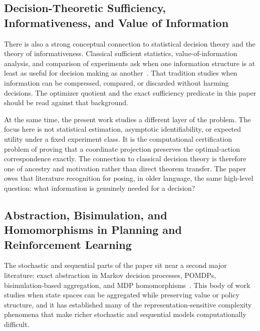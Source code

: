 \subsection{Decision-Theoretic Sufficiency, Informativeness, and Value of Information}

There is also a strong conceptual connection to statistical decision theory and the theory of informativeness. Classical sufficient statistics, value-of-information analysis, and comparison of experiments ask when one information structure is at least as useful for decision making as another~\cite{blackwell1953equivalent,savage1954foundations,raiffa1961applied,howard1966information}. That tradition studies when information can be compressed, compared, or discarded without harming decisions. The optimizer quotient and the exact sufficiency predicate in this paper should be read against that background.

At the same time, the present work studies a different layer of the problem. The focus here is not statistical estimation, asymptotic identifiability, or expected utility under a fixed experiment class. It is the computational certification problem of proving that a coordinate projection preserves the optimal-action correspondence exactly. The connection to classical decision theory is therefore one of ancestry and motivation rather than direct theorem transfer. The paper owes that literature recognition for posing, in older language, the same high-level question: what information is genuinely needed for a decision?

\subsection{Abstraction, Bisimulation, and Homomorphisms in Planning and Reinforcement Learning}

The stochastic and sequential parts of the paper sit near a second major literature: exact abstraction in Markov decision processes, POMDPs, bisimulation-based aggregation, and MDP homomorphisms~\cite{papadimitriou1987mdp,littman1998probplanning,mundhenk2000mdp,givan2003equivalence,ravindran2004algebraic}. This body of work studies when state spaces can be aggregated while preserving value or policy structure, and it has established many of the representation-sensitive complexity phenomena that make richer stochastic and sequential models computationally difficult.


